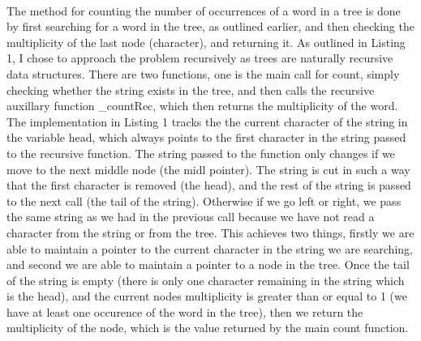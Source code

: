 \documentclass{article}
\begin{document}
  \\[12pt]
  \indent The method for counting the number of occurrences of a word in a tree is done by first searching for a word in the tree, as outlined earlier, and then checking the multiplicity of the last node (character), and returning it. As outlined in Listing 1, I chose to approach the problem recursively as trees are naturally recursive data structures. There are two functions, one is the main call for count, simply checking whether the string exists in the tree, and then calls the recursive auxillary function \_countRec, which then returns the multiplicity of the word. The implementation in Listing 1 tracks the the current character of the string in the variable head, which always points to the first character in the string passed to the recursive function. The string passed to the function only changes if we move to the next middle node (the midl pointer). The string is cut in such a way that the first character is removed (the head), and the rest of the string is passed to the next call (the tail of the string). Otherwise if we go left or right, we pass the same string as we had in the previous call because we have not read a character from the string or from the tree. This achieves two things, firstly we are able to maintain a pointer to the current character in the string we are searching, and second we are able to maintain a pointer to a node in the tree. Once the tail of the string is empty (there is only one character remaining in the string which is the head), and the current nodes multiplicity is greater than or equal to 1 (we have at least one occurence of the word in the tree), then we return the multiplicity of the node, which is the value returned by the main count function.
\end{document}
